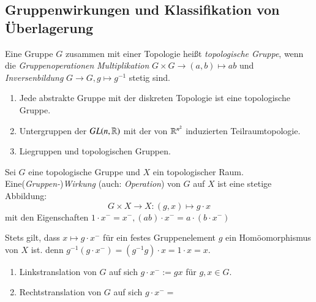 \documentclass[a4paper,10pt]{scrartcl}
\begin{document}
\subsection{Gruppenwirkungen und Klassifikation von Überlagerung}
\begin{df}
 Eine Gruppe $G$ zusammen mit einer Topologie heißt \emph{topologische Gruppe}, wenn die \emph{Gruppenoperationen} \emph{Multiplikation} $G\times G \to (a,b)\mapsto ab$ und \emph{Inversenbildung}
$G\to G, g\mapsto g^{-1}$ stetig sind.
\end{df}
\begin{exs*}
 \begin{enumerate}[1)]
  \item Jede abstrakte Gruppe mit der diskreten Topologie ist eine topologische Gruppe.
  \item Untergruppen der $GL(n, \mathbb{R})$ mit der von $\mathbb{R}^{n^2}$ induzierten Teilraumtopologie.  
  \item Liegruppen und topologischen Gruppen.
 \end{enumerate}
\end{exs*}
\begin{df}
 Sei $G$ eine topologische Gruppe und $X$ ein topologischer Raum. Eine(\emph{Gruppen-})\emph{Wirkung} (auch: \emph{Operation}) von $G$ auf $X$ ist eine stetige Abbildung:
\[
 G\times X\to X: (g,x) \mapsto g\cdot x
\]
mit den Eigenschaften $1\cdot x^{-} = x^{-}, (ab)\cdot x^{-}=a\cdot (b\cdot x^{-})$
\end{df}
\begin{note*}
 Stets gilt, dass $x\mapsto g\cdot x^{-}$ für ein festes Gruppenelement $g$ ein Homöomorphismus von $X$ ist. denn $g^{-1}(g\cdot x^{-})=(g^{-1}g)\cdot x=1\cdot x=x.$
\end{note*}
\begin{exs*}
 \begin{enumerate}[1)]
  \item Linkstranslation von $G$ auf sich $g\cdot x^{-}:=gx$ für $g,x\in G$.
  \item Rechtstranslation von $G$ auf sich $g\cdot x^{-}=$
 \end{enumerate}

\end{exs*}













 
 
\end{document}
